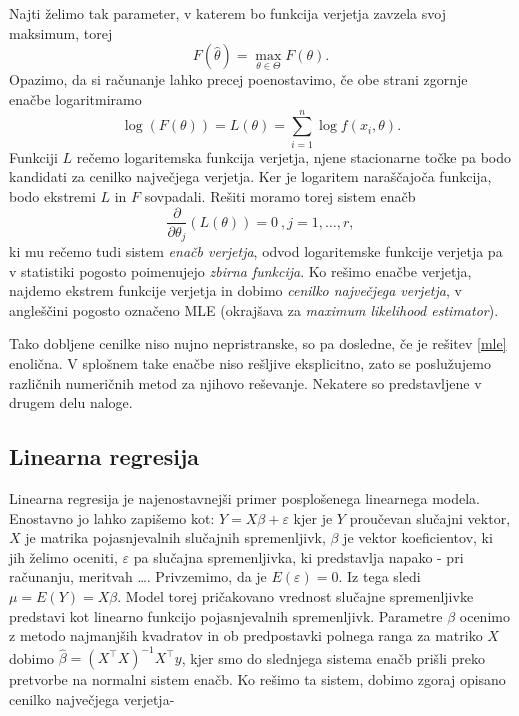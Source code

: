 \documentclass[12pt,a4paper]{amsart}
\theoremstyle{definition} %
\theoremstyle{plain} %
\begin{document}
Najti želimo tak parameter, v katerem bo funkcija verjetja zavzela svoj maksimum, torej 
\[
    F(\hat{\theta}) = \underset{\theta \in \Theta}{\max}{F(\theta)}.
\]
Opazimo, da si računanje lahko precej poenostavimo, če obe strani zgornje enačbe logaritmiramo
\begin{equation}
    \log(F(\theta)) = L(\theta) = \sum_{i=1}^{n}\log f(x_{i},\theta).
\end{equation}
Funkciji $L$ rečemo logaritemska funkcija verjetja, njene stacionarne točke pa bodo kandidati za cenilko največjega verjetja. Ker je logaritem 
naraščajoča funkcija, bodo ekstremi $L$ in $F$ sovpadali. Rešiti moramo torej sistem enačb
\begin{equation}\label{mle}
    \frac{\partial}{\partial \theta_{j}}(L(\theta)) = 0~,j=1,\ldots,r,
\end{equation}
ki mu rečemo tudi sistem \textit{enačb verjetja}, odvod logaritemske funkcije verjetja pa v statistiki pogosto poimenujejo \textit{zbirna funkcija}.
Ko rešimo enačbe verjetja, najdemo ekstrem funkcije verjetja in dobimo \textit{cenilko največjega verjetja}, v angleščini pogosto označeno MLE (okrajšava za
\textit{maximum likelihood estimator}).

Tako dobljene cenilke niso nujno nepristranske, so pa dosledne, če je rešitev \eqref{mle} enolična. V splošnem take enačbe niso rešljive eksplicitno, zato se poslužujemo različnih
numeričnih metod za njihovo reševanje. Nekatere so predstavljene v drugem delu naloge.

\subsection{Linearna regresija}
Linearna regresija je najenostavnejši primer posplošenega linearnega modela. Enostavno jo lahko zapišemo kot:
$
    Y = X \beta + \varepsilon
$
kjer je $Y$ proučevan slučajni vektor, $X$ je matrika pojasnjevalnih slučajnih spremenljivk, $\beta$ je vektor koeficientov, ki jih želimo oceniti,
$\varepsilon$ pa slučajna spremenljivka, ki predstavlja napako - pri računanju, meritvah \ldots. Privzemimo, da je $E(\varepsilon) = 0$. Iz tega sledi
$\mu = E(Y) = X\beta$. Model torej pričakovano vrednost slučajne spremenljivke predstavi kot linearno funkcijo pojasnjevalnih spremenljivk.
Parametre $\beta$ ocenimo z metodo najmanjših kvadratov in ob predpostavki polnega ranga za matriko $X$ dobimo $\hat{\beta} =  (X^\top X)^{-1}
X^\top y$, kjer smo do slednjega sistema enačb prišli preko pretvorbe na normalni sistem enačb. Ko rešimo ta sistem, dobimo zgoraj opisano cenilko največjega verjetja-
\end{document}

